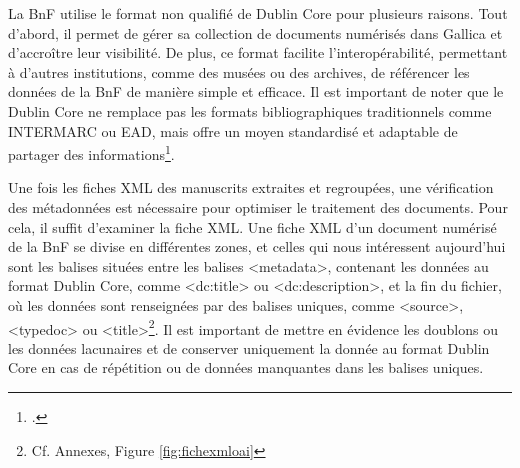 \documentclass[a4paper,12pt,twoside]{book}
\begin{document}
	La BnF utilise le format non qualifié de Dublin Core pour plusieurs raisons. Tout d'abord, il permet de gérer sa collection de documents numérisés dans Gallica et d'accroître leur visibilité. De plus, ce format facilite l'interopérabilité, permettant à d'autres institutions, comme des musées ou des archives, de référencer les données de la BnF de manière simple et efficace. Il est important de noter que le Dublin Core ne remplace pas les formats bibliographiques traditionnels comme INTERMARC ou EAD, mais offre un moyen standardisé et adaptable de partager des informations\footcite{goos_dublin_2002}.
	
	Une fois les fiches XML des manuscrits extraites et regroupées, une vérification des métadonnées est nécessaire pour optimiser le traitement des documents. Pour cela, il suffit d'examiner la fiche XML. Une fiche XML d’un document numérisé de la BnF se divise en différentes zones, et celles qui nous intéressent aujourd’hui sont les balises situées entre les balises <metadata>, contenant les données au format Dublin Core, comme <dc:title> ou <dc:description>, et la fin du fichier, où les données sont renseignées par des balises uniques, comme <source>, <typedoc> ou <title>\footnote{Cf. Annexes, Figure \ref{fig:fichexmloai}}. Il est important de mettre en évidence les doublons ou les données lacunaires et de conserver uniquement la donnée au format Dublin Core en cas de répétition ou de données manquantes dans les balises uniques.
	\\
	
\end{document}
